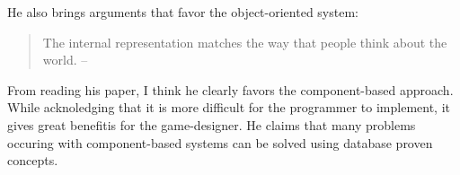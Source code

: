 He also brings arguments that favor the object-oriented system:
\begin{quote}
The internal representation matches the way that people think about the world. -- \cite[Page 4]{Doherty_2003}
\end{quote}

From reading his paper, I think he clearly favors the component-based approach. While acknoledging that it is more
difficult for the programmer to implement, it gives great benefitis for the game-designer. He claims that many problems
occuring with component-based systems can be solved using database proven concepts.



